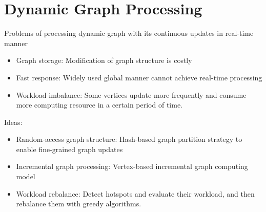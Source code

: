 \section{Dynamic Graph Processing}
Problems of processing dynamic graph with its continuous updates in real-time manner
\begin{itemize}
\item Graph storage: Modification of graph structure is costly
\item Fast response: Widely used global manner cannot achieve real-time processing
\item Workload imbalance: Some vertices update more frequently and consume more computing resource in a certain period of time.
\end{itemize}

Ideas:
\begin{itemize}
\item Random-access graph structure: Hash-based graph partition strategy to enable fine-grained graph updates
\item Incremental graph processing: Vertex-based incremental graph computing model
\item Workload rebalance: Detect hotspots and evaluate their workload, and then rebalance them with greedy algorithms.
\end{itemize}
